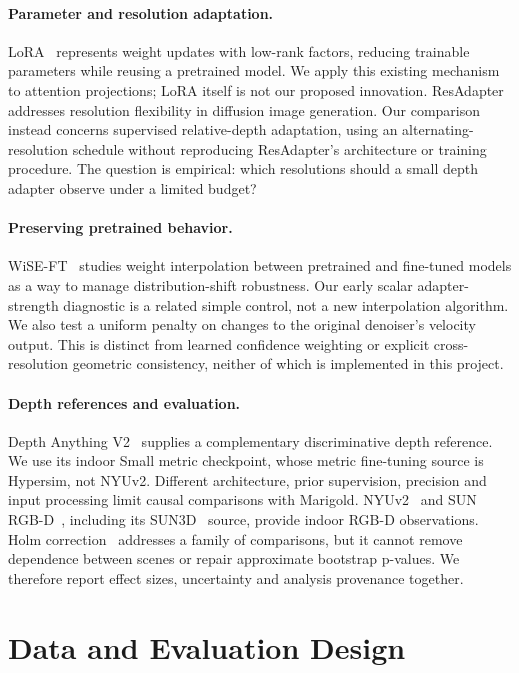 \documentclass[10pt,twocolumn,letterpaper]{article}
\begin{document}
\paragraph{Parameter and resolution adaptation.}
LoRA~\cite{lora} represents weight updates with low-rank factors, reducing trainable parameters while reusing a pretrained model. We apply this existing mechanism to attention projections; LoRA itself is not our proposed innovation. ResAdapter~\cite{resadapter} addresses resolution flexibility in diffusion image generation. Our comparison instead concerns supervised relative-depth adaptation, using an alternating-resolution schedule without reproducing ResAdapter's architecture or training procedure. The question is empirical: which resolutions should a small depth adapter observe under a limited budget?

\paragraph{Preserving pretrained behavior.}
WiSE-FT~\cite{wise} studies weight interpolation between pretrained and fine-tuned models as a way to manage distribution-shift robustness. Our early scalar adapter-strength diagnostic is a related simple control, not a new interpolation algorithm. We also test a uniform penalty on changes to the original denoiser's velocity output. This is distinct from learned confidence weighting or explicit cross-resolution geometric consistency, neither of which is implemented in this project.

\paragraph{Depth references and evaluation.}
Depth Anything V2~\cite{dav2} supplies a complementary discriminative depth reference. We use its indoor Small metric checkpoint, whose metric fine-tuning source is Hypersim, not NYUv2. Different architecture, prior supervision, precision and input processing limit causal comparisons with Marigold. NYUv2~\cite{nyu} and SUN RGB-D~\cite{sunrgbd}, including its SUN3D~\cite{sun3d} source, provide indoor RGB-D observations. Holm correction~\cite{holm} addresses a family of comparisons, but it cannot remove dependence between scenes or repair approximate bootstrap p-values. We therefore report effect sizes, uncertainty and analysis provenance together.

\section{Data and Evaluation Design}
\end{document}
